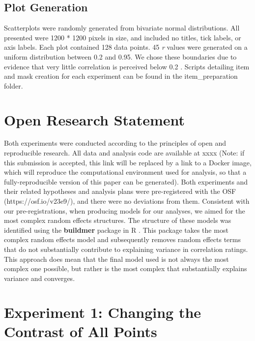 \documentclass[preprint, 3p,
authoryear]{elsarticle} %
\begin{document}
\hypertarget{plot-generation}{%
\subsection{Plot Generation}\label{plot-generation}}

Scatterplots were randomly generated from bivariate normal
distributions. All presented were 1200 * 1200 pixels in size, and
included no titles, tick labels, or axis labels. Each plot contained 128
data points. 45 \emph{r} values were generated on a uniform distribution
between 0.2 and 0.95. We chose these boundaries due to evidence that
very little correlation is perceived below 0.2
\citep{bobko_1979, cleveland_1982, strahan_1978}. Scripts detailing item
and mask creation for each experiment can be found in the
item\_preparation folder.

\hypertarget{open-research-statement}{%
\section{Open Research Statement}\label{open-research-statement}}

Both experiments were conducted according to the principles of open and
reproducible research. All data and analysis code are available at xxxx
(Note: if this submission is accepted, this link will be replaced by a
link to a Docker image, which will reproduce the computational
environment used for analysis, so that a fully-reproducible version of
this paper can be generated). Both experiments and their related
hypotheses and analysis plans were pre-registered with the OSF
(https://osf.io/v23e9/), and there were no deviations from them.
Consistent with our pre-registrations, when producing models for our
analyses, we aimed for the most complex random effects structures. The
structure of these models was identified using the \textbf{buildmer}
package in R \citep{voeten_buildmer_2022}. This package takes the most
complex random effects model and subsequently removes random effects
terms that do not substantially contribute to explaining variance in
correlation ratings. This approach does mean that the final model used
is not always the most complex one possible, but rather is the most
complex that substantially explains variance and converges.

\hypertarget{experiment-1-changing-the-contrast-of-all-points}{%
\section{Experiment 1: Changing the Contrast of All
Points}\label{experiment-1-changing-the-contrast-of-all-points}}
\end{document}

